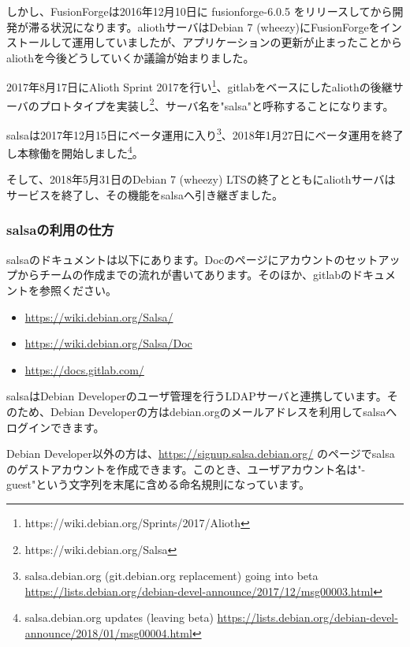 \documentclass[mingoth,a4paper]{jsarticle}
\begin{document}
しかし、FusionForgeは2016年12月10日に fusionforge-6.0.5 をリリースしてから開発が滞る状況になります。aliothサーバはDebian 7 (wheezy)にFusionForgeをインストールして運用していましたが、アプリケーションの更新が止まったことからaliothを今後どうしていくか議論が始まりました。


2017年8月17日にAlioth Sprint 2017を行い\footnote{https://wiki.debian.org/Sprints/2017/Alioth}、gitlabをベースにしたaliothの後継サーバのプロトタイプを実装し\footnote{https://wiki.debian.org/Salsa}、サーバ名を"salsa"と呼称することになります。


salsaは2017年12月15日にベータ運用に入り\footnote{salsa.debian.org (git.debian.org replacement) going into beta \url{https://lists.debian.org/debian-devel-announce/2017/12/msg00003.html}}、2018年1月27日にベータ運用を終了し本稼働を開始しました\footnote{salsa.debian.org updates (leaving beta) \url{https://lists.debian.org/debian-devel-announce/2018/01/msg00004.html}}。


そして、2018年5月31日のDebian 7 (wheezy) LTSの終了とともにaliothサーバはサービスを終了し、その機能をsalsaへ引き継ぎました。


\subsubsection{salsaの利用の仕方}


salsaのドキュメントは以下にあります。Docのページにアカウントのセットアップからチームの作成までの流れが書いてあります。そのほか、gitlabのドキュメントを参照ください。

\begin{itemize}
  \item \url{https://wiki.debian.org/Salsa/}
  \item \url{https://wiki.debian.org/Salsa/Doc}
  \item \url{https://docs.gitlab.com/}
\end{itemize}


salsaはDebian Developerのユーザ管理を行うLDAPサーバと連携しています。そのため、Debian Developerの方はdebian.orgのメールアドレスを利用してsalsaへログインできます。


Debian Developer以外の方は、\url{https://signup.salsa.debian.org/} のページでsalsaのゲストアカウントを作成できます。このとき、ユーザアカウント名は"-guest"という文字列を末尾に含める命名規則になっています。
\end{document}
